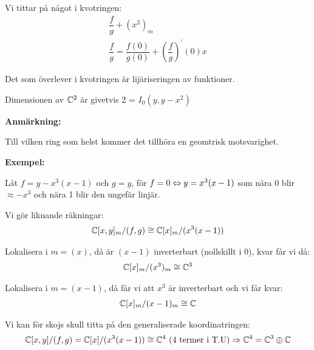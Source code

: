 \noindent Vi tittar på något i kvotringen:
\begin{equation*}
  \begin{gathered}
    \dfrac{f}{g}+(x^2)_m\\
    \dfrac{f}{g} = \dfrac{f(0)}{g(0)}+\left(\dfrac{f}{g}\right)^{\prime}(0)x
  \end{gathered}
\end{equation*}\par
\noindent Det som överlever i kvotringen är lijäriseringen av funktioner.
\par\bigskip
\noindent Dimensionen av $\mathbb{C}^2$ är givetvis 2 = $I_0(y,y-x^2)$
\par\bigskip
\noindent\textbf{Anmärkning:}\par
\noindent Till vilken ring som helst kommer det tillhöra en geomtrisk motsvarighet.
\par\bigskip
\noindent\textbf{Exempel:}\par
\noindent Låt $f = y-x^3(x-1)$ och $g = y$, för $f = 0\Leftrightarrow y=x^3(x-1)$ som nära 0 blir $\approx -x^3$ och nära 1 blir den ungefär linjär.\par
\noindent Vi gör liknande räkningar:
\begin{equation*}
  \begin{gathered}
    \mathbb{C}[x,y]_m/(f,g)\cong\mathbb{C}[x]_m/(x^3(x-1))
  \end{gathered}
\end{equation*}\par
\noindent Lokalisera i $m = (x)$, då är $(x-1)$ inverterbart (nollskillt i 0), kvar får vi då:
\begin{equation*}
  \begin{gathered}
    \mathbb{C}[x]_m/(x^3)_m\cong\mathbb{C}^3
  \end{gathered}
\end{equation*}\par
\noindent Lokalisera i $m=(x-1)$, då får vi att $x^3$ är inverterbart och vi får kvar:
\begin{equation*}
  \begin{gathered}
    \mathbb{C}[x]_m/(x-1)_m\cong\mathbb{C}
  \end{gathered}
\end{equation*}
\par\bigskip
\noindent Vi kan för skojs skull titta på den generaliserade koordinatringen:
\begin{equation*}
  \begin{gathered}
    \mathbb{C}[x,y]/(f,g) = \mathbb{C}[x]/(x^3(x-1))\cong\mathbb{C}^4\text{ (4 termer i T.U)}\Rightarrow\mathbb{C}^4 = \mathbb{C}^3\oplus\mathbb{C}
  \end{gathered}
\end{equation*}
